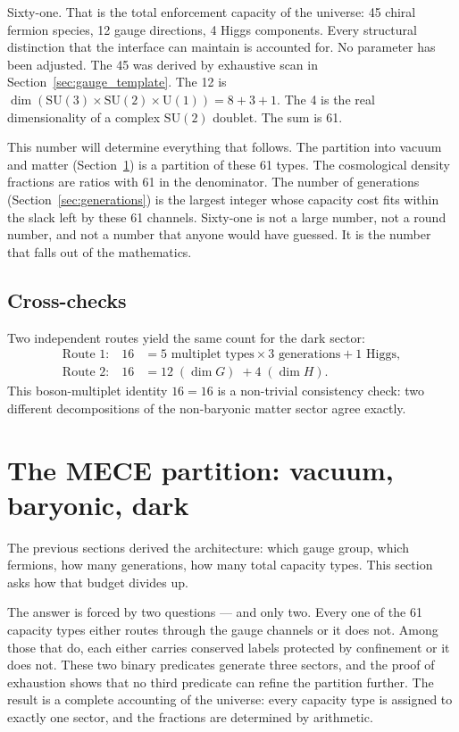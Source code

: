 \documentclass[11pt]{article}
\newcommand{\SU}{\mathrm{SU}}
\newcommand{\U}{\mathrm{U}}
\begin{document}
Sixty-one.  That is the total enforcement capacity of the universe: 45 chiral fermion species, 12 gauge directions, 4 Higgs components.  Every structural distinction that the interface can maintain is accounted for.  No parameter has been adjusted.  The 45 was derived by exhaustive scan in Section~\ref{sec:gauge_template}.  The 12 is $\dim(\SU(3) \times \SU(2) \times \U(1)) = 8 + 3 + 1$.  The 4 is the real dimensionality of a complex $\SU(2)$ doublet.  The sum is 61.

This number will determine everything that follows.  The partition into vacuum and matter (Section~\ref{sec:partition}) is a partition of these 61 types.  The cosmological density fractions are ratios with 61 in the denominator.  The number of generations (Section~\ref{sec:generations}) is the largest integer whose capacity cost fits within the slack left by these 61 channels.  Sixty-one is not a large number, not a round number, and not a number that anyone would have guessed.  It is the number that falls out of the mathematics.

\subsection{Cross-checks}

Two independent routes yield the same count for the dark sector:
\begin{align}
\text{Route 1:} \quad 16 &= 5 \text{ multiplet types} \times 3 \text{ generations} + 1 \text{ Higgs}, \\
\text{Route 2:} \quad 16 &= 12 \;(\dim G) \;+ 4 \;(\dim H).
\end{align}
This boson-multiplet identity $16 = 16$ is a non-trivial consistency check: two different decompositions of the non-baryonic matter sector agree exactly.


\section{The MECE partition: vacuum, baryonic, dark}
\label{sec:partition}

The previous sections derived the architecture: which gauge group, which fermions, how many generations, how many total capacity types.  This section asks how that budget divides up.

The answer is forced by two questions --- and only two.  Every one of the 61 capacity types either routes through the gauge channels or it does not.  Among those that do, each either carries conserved labels protected by confinement or it does not.  These two binary predicates generate three sectors, and the proof of exhaustion shows that no third predicate can refine the partition further.  The result is a complete accounting of the universe: every capacity type is assigned to exactly one sector, and the fractions are determined by arithmetic.
\end{document}

